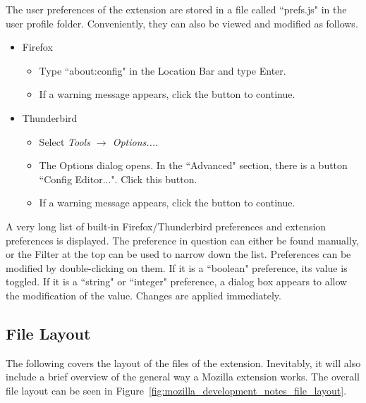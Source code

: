 The user preferences of the extension are stored in a file called ``prefs.js" in the user profile folder. Conveniently, they can also be viewed and modified as follows. 
\begin{itemize}
  \item Firefox \begin{itemize}
    \item Type ``about:config" in the Location Bar and type Enter.
    \item If a warning message appears, click the button to continue.
  \end{itemize}
  \item Thunderbird \begin{itemize}
    \item Select \emph{Tools $\rightarrow$ Options...}.
    \item The Options dialog opens. In the ``Advanced" section, there is a button ``Config Editor...". Click this button.
    \item If a warning message appears, click the button to continue.
  \end{itemize}
\end{itemize}
A very long list of built-in Firefox/Thunderbird preferences and extension preferences is displayed. The preference in question can either be found manually, or the Filter at the top can be used to narrow down the list. Preferences can be modified by double-clicking on them. If it is a ``boolean" preference, its value is toggled. If it is a ``string" or ``integer" preference, a dialog box appears to allow the modification of the value. Changes are applied immediately. 

\subsection{File Layout}
The following covers the layout of the files of the extension. Inevitably, it will also include a brief overview of the general way a Mozilla extension works. The overall file layout can be seen in Figure~\ref{fig:mozilla_development_notes_file_layout}.

